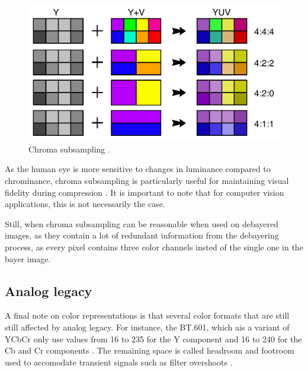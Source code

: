 \begin{figure}[H]
    \centering
    \includegraphics[width=.8\textwidth]{figures/debayer/chroma_subsampling.pdf}
    \caption{Chroma subsampling \cite{stevo-88EnglishMostWidely2010}.}
    \label{fig:ycbcr_example}
\end{figure}

As the human eye is more sensitive to changes in luminance compared to chrominance, chroma subsampling is particularly useful for maintaining visual fidelity during compression \cite{lambWhyRodsCones2016}.
It is important to note that for computer vision applications, this is not necessarily the case.

Still, when chroma subsampling can be reasonable when used on debayered images, as they contain a lot of redundant information from the debayering process, as every pixel contains three color channels insted of the single one in the bayer image.


\subsection{Analog legacy}
A final note on color representations is that several color formats that are still still affected by analog legacy.
For instance, the BT.601, which ais a variant of YCbCr only use values from 16 to 235 for the Y component and 16 to 240 for the Cb and Cr components \cite{YCbCr2023}.
The remaining space is called headroom and footroom used to accomodate transient signals such as filter overshoots \cite{Rec6012023}.


